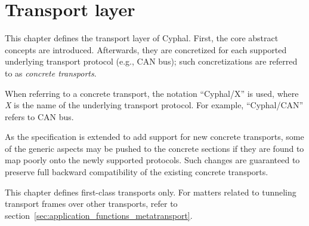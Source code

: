 \chapter{Transport layer}\label{sec:transport}

This chapter defines the transport layer of Cyphal.
First, the core abstract concepts are introduced.
Afterwards, they are concretized for each supported underlying transport protocol (e.g., CAN bus);
such concretizations are referred to as \emph{concrete transports}.

When referring to a concrete transport, the notation ``Cyphal/X'' is used,
where \emph{X} is the name of the underlying transport protocol.
For example, ``Cyphal/CAN'' refers to CAN bus.

As the specification is extended to add support for new concrete transports,
some of the generic aspects may be pushed to the concrete sections
if they are found to map poorly onto the newly supported protocols.
Such changes are guaranteed to preserve full backward compatibility of the existing concrete transports.

This chapter defines first-class transports only.
For matters related to tunneling transport frames over other transports,
refer to section~\ref{sec:application_functions_metatransport}.

\clearpage
\clearpage
\clearpage
